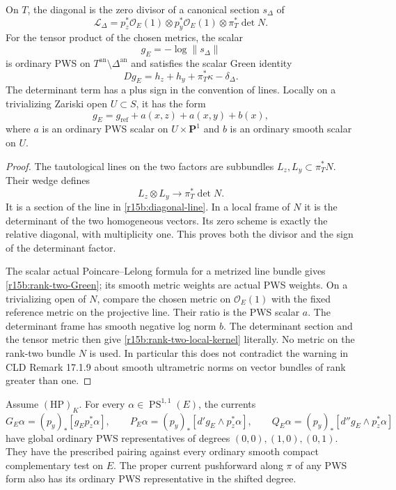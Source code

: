 \begin{lemma}
\label{r15b:rank-two-kernel}
On $T$, the diagonal is the zero divisor of a canonical section
$s_\Delta$ of
\[
 \mathcal L_\Delta
   =p_z^*\mathcal O_E(1)\otimes p_y^*\mathcal O_E(1)
                         \otimes\pi_T^*\det N.
\tag{PB15.2}\label{r15b:diagonal-line}
\]
For the tensor product of the chosen metrics, the scalar
\[
                         g_E=-\log\|s_\Delta\|
\]
is ordinary PWS on $T^{\mathrm{an}}\setminus\Delta^{\mathrm{an}}$
and satisfies the scalar Green identity
\[
             Dg_E=h_z+h_y+\pi_T^*\kappa-\delta_\Delta.
\tag{PB15.3}\label{r15b:rank-two-Green}
\]
The determinant term has a plus sign in the convention of lines.
Locally on a trivializing Zariski open $U\subset S$, it has
the form
\[
          g_E=g_{\mathrm{ref}}+a(x,z)+a(x,y)+b(x),
\tag{PB15.4}\label{r15b:rank-two-local-kernel}
\]
where $a$ is an ordinary PWS scalar on $U\times\mathbf P^1$
and $b$ is an ordinary smooth scalar on $U$.
\end{lemma}

\begin{proof}
The tautological lines on the two factors are subbundles
$L_z,L_y\subset\pi_T^*N$. Their wedge defines
\[
                 L_z\otimes L_y\longrightarrow\pi_T^*\det N.
\]
It is a section of the line in \eqref{r15b:diagonal-line}.
In a local frame of $N$ it is the determinant of the two
homogeneous vectors. Its zero scheme is exactly the relative
diagonal, with multiplicity one. This proves both the divisor
and the sign of the determinant factor.

The scalar actual Poincare--Lelong formula for a metrized line
bundle gives \eqref{r15b:rank-two-Green}; its smooth metric
weights are actual PWS weights. On a trivializing open of $N$,
compare the chosen metric on $\mathcal O_E(1)$ with the fixed
reference metric on the projective line. Their ratio is the
PWS scalar $a$. The determinant frame has smooth negative log
norm $b$. The determinant section and the tensor metric then
give \eqref{r15b:rank-two-local-kernel} literally. No metric on
the rank-two bundle $N$ is used. In particular this does not
contradict the warning in CLD Remark 17.1.9 about smooth
ultrametric norms on vector bundles of rank greater than one.
\end{proof}

\begin{proposition}
\label{r15b:rank-two-outputs}
Assume $(\mathrm{HP})_K$. For every
$\alpha\in\operatorname{PS}^{1,1}(E)$, the currents
\[
 G_E\alpha=(p_y)_*[g_Ep_z^*\alpha],\qquad
 P_E\alpha=(p_y)_*[d'g_E\wedge p_z^*\alpha],\qquad
 Q_E\alpha=(p_y)_*[d''g_E\wedge p_z^*\alpha]
\tag{PB15.5}\label{r15b:rank-two-outputs-formula}
\]
have global ordinary PWS representatives of degrees
$(0,0),(1,0),(0,1)$. They have the prescribed pairing against
every ordinary smooth compact complementary test on $E$.
The proper current pushforward along $\pi$ of any PWS form
also has its ordinary PWS representative in the shifted degree.
\end{proposition}

